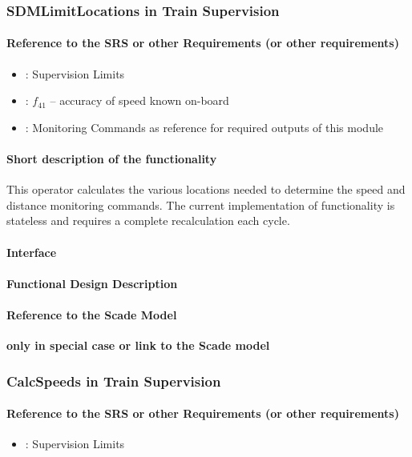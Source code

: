 \subsubsection{SDMLimitLocations in Train Supervision} 
\paragraph{Reference to the SRS or other Requirements (or other requirements)}
\begin{itemize}
	\item \cite[Chapt.~3.13.9]{subset-026}: Supervision Limits 
	\item \cite[Chapt.~5..3.1.2]{subset-041}: $f_{41}$ -- accuracy of speed known on-board
	\item \cite[Chapt.~3.13.10]{subset-026}: Monitoring Commands as reference for required outputs of this module
\end{itemize}

\paragraph{Short description of the functionality}
This operator calculates the various locations needed to determine the speed and distance monitoring commands. The current implementation of functionality is stateless and requires a complete recalculation each cycle.

\paragraph{Interface}
\paragraph{Functional Design Description}

\paragraph{Reference to the Scade Model}
\textbf{only in special case or link to the Scade model}

\subsubsection{CalcSpeeds in Train Supervision}
\paragraph{Reference to the SRS or other Requirements (or other requirements)}
\begin{itemize}
	\item \cite[Chapt.~3.13.9]{subset-026}: Supervision Limits 
\end{itemize}
